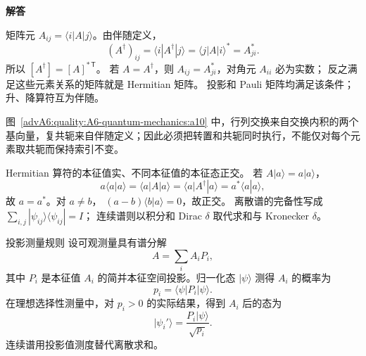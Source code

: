 \begin{advsolution}
\begin{center}\begin{minipage}{.96\linewidth}\centering
\raggedright{\bfseries\color{DeepBlue}解答}\par\smallskip\centering

\label{advA6:quality:A6-quantum-mechanics:a10}
\end{minipage}\end{center}

矩阵元 $A_{ij}=\langle i|A|j\rangle$。由伴随定义，
\[
 (A^\dagger)_{ij}
 =\langle i|A^\dagger|j\rangle
 =\langle j|A|i\rangle^*
 =A_{ji}^*.
\]
所以 $[A^\dagger]=[A]^{*\,\mathsf T}$。
若 $A=A^\dagger$，则
$A_{ij}=A_{ji}^*$，对角元 $A_{ii}$ 必为实数；
反之满足这些元素关系的矩阵就是 Hermitian 矩阵。
投影和 Pauli 矩阵均满足该条件；升、降算符互为伴随。

图~\ref{advA6:quality:A6-quantum-mechanics:a10} 中，行列交换来自交换内积的两个基向量，复共轭来自伴随定义；因此必须把转置和共轭同时执行，不能仅对每个元素取共轭而保持索引不变。
\end{advsolution}

Hermitian 算符的本征值实、不同本征值的本征态正交。
若 $A|a\rangle=a|a\rangle$，
\[
 a\langle a|a\rangle
 =\langle a|A|a\rangle
 =\langle a|A^\dagger|a\rangle
 =a^*\langle a|a\rangle,
\]
故 $a=a^*$。对 $a\ne b$，
$(a-b)\langle b|a\rangle=0$，故正交。
离散谱的完备性写成
$\sum_{i,j}|\psi_{ij}\rangle\langle\psi_{ij}|=I$；
连续谱则以积分和 Dirac $\delta$ 取代求和与 Kronecker $\delta$。

\begin{advtheorem}{投影测量规则}\label{advA6:thm:copenhagen}
设可观测量具有谱分解
\[
 A=\sum_iA_iP_i,
\]
其中 $P_i$ 是本征值 $A_i$ 的简并本征空间投影。归一化态
$|\psi\rangle$ 测得 $A_i$ 的概率为
\[
 \boxed{p_i=\langle\psi|P_i|\psi\rangle}.
\]
在理想选择性测量中，对 $p_i>0$ 的实际结果，得到 $A_i$ 后的态为
\[
 \boxed{|\psi_i'\rangle=
 \frac{P_i|\psi\rangle}{\sqrt{p_i}}}.
\]
连续谱用投影值测度替代离散求和。
\end{advtheorem}

